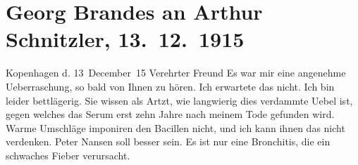 

         
         \renewcommand{\erwaehntePersonen}{Personen:  ?? [Dänischer Journalist],  ?? [Korrespondent aus Russland], Sophie Hatzfeld, Georg Herwegh, Emma Herwegh, Marcel Herwegh, Ferdinand Lassalle, Peter Nansen, Reinhold Philipp}
         \renewcommand{\erwaehnteOrte}{Orte: Deutschland, Dänemark, Kopenhagen, Russland, Wien, Österreich}
         \renewcommand{\erwaehnteWerke}{Werke: ?? [Russischer Korrespondentenbericht], Ferdinand Lassalle’s Briefe an Georg Herwegh, Professor Bernhardi. Komödie in fünf Akten}
               \section[Georg Brandes an Arthur Schnitzler, 13. 12. 1915]{ Georg Brandes an Arthur Schnitzler, 13. 12. 1915}\nopagebreak{}\rehead{ }\begin{ledgroupsized}[t]{13cm}\normalsize\beginnumbering \toendnotes[C]{\smallbreak\pagebreak[2]} 
\toendnotes[C]{\smallbreak}\pstart
           \raggedleft{}{\pb}Kopenhagen d. 13 December 15\pend
           \pstart
           Verehrter Freund \hspace*{1.5em}Es war mir eine angenehme Ueberraschung, so bald
               von Ihnen zu hören. Ich erwartete das nicht. Ich bin leider bettlägerig. Sie wissen
               als Artzt, wie langwierig dies verdammte Uebel ist, gegen welches das Serum erst zehn
               Jahre nach meinem Tode gefunden wird. Warme Umschläge imponiren den Bacillen nicht,
               und ich kann ihnen das nicht verdenken.\pend
           \pstart
           Peter Nansen soll besser sein. Es ist nur eine
               Bronchitis, die ein schwaches Fieber verursacht.\pend

\end{ledgroupsized}
